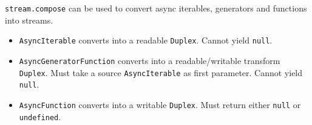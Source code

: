 \begin{Shaded}
\begin{Highlighting}[]
\OperatorTok{,} \OperatorTok{;}

\OperatorTok{=}  \NormalTok{(\{}
  \OperatorTok{,}\OperatorTok{,}
    \NormalTok{(}\OperatorTok{,} \NormalTok{(}\StringTok{\textquotesingle{} \textquotesingle{}}\OperatorTok{,} \StringTok{\textquotesingle{}\textquotesingle{}}\NormalTok{))}\OperatorTok{;}
\NormalTok{  \}}\OperatorTok{,}
\NormalTok{\})}\OperatorTok{;}

 \OperatorTok{*} 
   \NormalTok{ (}
     \NormalTok{()}\OperatorTok{;}
\NormalTok{  \}}
\NormalTok{\}}

\OperatorTok{=} \StringTok{\textquotesingle{}\textquotesingle{}}\OperatorTok{;}
 \NormalTok{ (} \OperatorTok{,}\NormalTok{(}\NormalTok{)) \{}
\OperatorTok{+=}\OperatorTok{;}
\NormalTok{\}}

\OperatorTok{;} 
\end{Highlighting}
\end{Shaded}

\texttt{stream.compose} can be used to convert async iterables,
generators and functions into streams.

\begin{itemize}
\tightlist
\item
  \texttt{AsyncIterable} converts into a readable \texttt{Duplex}.
  Cannot yield \texttt{null}.
\item
  \texttt{AsyncGeneratorFunction} converts into a readable/writable
  transform \texttt{Duplex}. Must take a source \texttt{AsyncIterable}
  as first parameter. Cannot yield \texttt{null}.
\item
  \texttt{AsyncFunction} converts into a writable \texttt{Duplex}. Must
  return either \texttt{null} or \texttt{undefined}.
\end{itemize}

